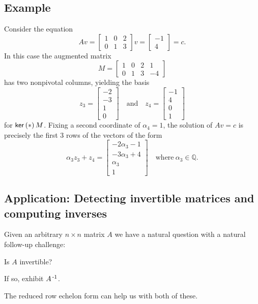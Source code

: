 \documentclass{memoir}
\begin{document}
\subsection*{Example}

Consider the equation \[ Av = \begin{bmatrix} 1 & 0 & 2 \\ 0 & 1 & 3 \end{bmatrix} v = \begin{bmatrix} -1 \\ 4 \end{bmatrix} = c. \] In this case the augmented matrix \[ M = \left[ \begin{array}{ccc|c} 1 & 0 & 2 & 1 \\ 0 & 1 & 3 & -4 \end{array}\right] \] has two nonpivotal columns, yielding the basis \[ z_3 = \begin{bmatrix} -2 \\ -3 \\ 1 \\ 0 \end{bmatrix} \quad \mathrm{and} \quad z_4 = \begin{bmatrix} -1 \\ 4 \\ 0 \\ 1 \end{bmatrix} \] for $\operatorname{\mathsf{ker}}\left(*\right){M}$. Fixing a second coordinate of $\alpha_4 = 1$, the solution of $Av = c$ is precisely the first 3 rows of the vectors of the form \[ \alpha_3 z_3 + z_4 = \begin{bmatrix} -2\alpha_3 - 1 \\ -3 \alpha_3 + 4 \\ \alpha_3 \\ 1 \end{bmatrix} \quad \mathrm{where}\ \alpha_3 \in \mathbb{Q}. \]

\subsection*{Application: Detecting invertible matrices and computing inverses}

Given an arbitrary $n \times n$ matrix $A$ we have a natural question with a natural follow-up challenge:
\begin{enumerate*}
\item Is $A$ invertible?
\item If so, exhibit $A^{{\,\text{-}1}}$.
\end{enumerate*}
The reduced row echelon form can help us with both of these.
\end{document}
